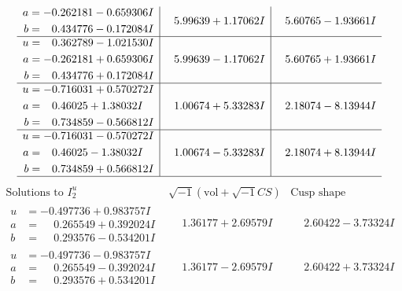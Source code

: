 \documentclass[1p]{elsarticle_modified}
\theoremstyle{definition}
\newcommand{\I}{\sqrt{-1}}
\begin{document}
$$\begin{array}{c|c|c}
\begin{aligned}
a &= -0.262181 - 0.659306 I \\
b &= \phantom{-}0.434776 - 0.172084 I\end{aligned}
 & \phantom{-}5.99639 + 1.17062 I & \phantom{-}5.60765 - 1.93661 I \\ \hline\begin{aligned}
u &= \phantom{-}0.362789 - 1.021530 I \\
a &= -0.262181 + 0.659306 I \\
b &= \phantom{-}0.434776 + 0.172084 I\end{aligned}
 & \phantom{-}5.99639 - 1.17062 I & \phantom{-}5.60765 + 1.93661 I \\ \hline\begin{aligned}
u &= -0.716031 + 0.570272 I \\
a &= \phantom{-}0.46025 + 1.38032 I \\
b &= \phantom{-}0.734859 - 0.566812 I\end{aligned}
 & \phantom{-}1.00674 + 5.33283 I & \phantom{-}2.18074 - 8.13944 I \\ \hline\begin{aligned}
u &= -0.716031 - 0.570272 I \\
a &= \phantom{-}0.46025 - 1.38032 I \\
b &= \phantom{-}0.734859 + 0.566812 I\end{aligned}
 & \phantom{-}1.00674 - 5.33283 I & \phantom{-}2.18074 + 8.13944 I\\
 \hline 
 \end{array}$$\newpage$$\begin{array}{c|c|c}  
\text{Solutions to }I^u_{2}& \I (\text{vol} + \sqrt{-1}CS) & \text{Cusp shape}\\
 \hline 
\begin{aligned}
u &= -0.497736 + 0.983757 I \\
a &= \phantom{-}0.265549 + 0.392024 I \\
b &= \phantom{-}0.293576 - 0.534201 I\end{aligned}
 & \phantom{-}1.36177 + 2.69579 I & \phantom{-}2.60422 - 3.73324 I \\ \hline\begin{aligned}
u &= -0.497736 - 0.983757 I \\
a &= \phantom{-}0.265549 - 0.392024 I \\
b &= \phantom{-}0.293576 + 0.534201 I\end{aligned}
 & \phantom{-}1.36177 - 2.69579 I & \phantom{-}2.60422 + 3.73324 I \\ \hline\begin{aligned}

\end{aligned}
\end{array}$$
\end{document}
